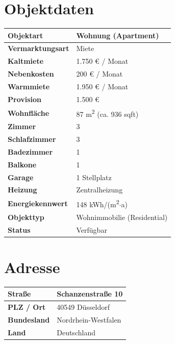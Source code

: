 \documentclass[11pt,a4paper]{article}
\begin{document}
\vspace{0.5cm}

\section*{Objektdaten}

\begin{tabularx}{\textwidth}{|l|X|}
\hline
\textbf{Objektart}        & Wohnung (Apartment) \\
\hline
\textbf{Vermarktungsart}  & Miete \\
\hline
\textbf{Kaltmiete}        & 1.750 \euro{} / Monat \\
\hline
\textbf{Nebenkosten}      & 200 \euro{} / Monat \\
\hline
\textbf{Warmmiete}        & 1.950 \euro{} / Monat \\
\hline
\textbf{Provision}        & 1.500 \euro{} \\
\hline
\textbf{Wohnfläche}       & 87 m\textsuperscript{2} (ca. 936 sqft) \\
\hline
\textbf{Zimmer}           & 3 \\
\hline
\textbf{Schlafzimmer}     & 3 \\
\hline
\textbf{Badezimmer}       & 1 \\
\hline
\textbf{Balkone}          & 1 \\
\hline
\textbf{Garage}           & 1 Stellplatz \\
\hline
\textbf{Heizung}          & Zentralheizung \\
\hline
\textbf{Energiekennwert}  & 148 kWh/(m\textsuperscript{2}$\cdot$a) \\
\hline
\textbf{Objekttyp}        & Wohnimmobilie (Residential) \\
\hline
\textbf{Status}           & Verfügbar \\
\hline
\end{tabularx}

\vspace{0.5cm}

\section*{Adresse}

\begin{tabularx}{\textwidth}{|l|X|}
\hline
\textbf{Straße}           & Schanzenstraße 10 \\
\hline
\textbf{PLZ / Ort}        & 40549 Düsseldorf \\
\hline
\textbf{Bundesland}       & Nordrhein-Westfalen \\
\hline
\textbf{Land}             & Deutschland \\
\hline
\end{tabularx}
\end{document}
